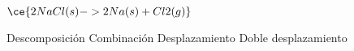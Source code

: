 $\ce{2NaCl(s) -> 2Na(s) + Cl2(g)}$

\begin{choices}
    \CorrectChoice Descomposición
    \choice Combinación
    \choice Desplazamiento
    \choice Doble desplazamiento
\end{choices}